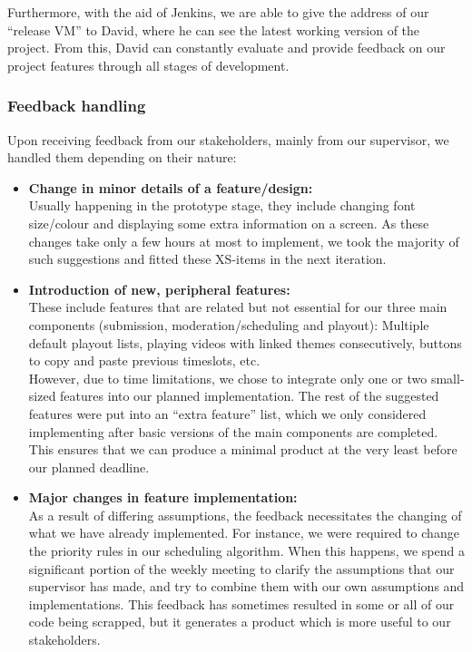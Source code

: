 \documentclass[a4paper, titlepage]{article}
\begin{document}
Furthermore, with the aid of Jenkins, we are able to give the address of our ``release VM'' to David, where he can see the latest working version of the project. From this, David can constantly evaluate and provide feedback on our project features through all stages of development.

\subsubsection{Feedback handling}

Upon receiving feedback from our stakeholders, mainly from our supervisor, we handled them depending on their nature:

\begin{itemize}

  \item \textbf{Change in minor details of a feature/design:} \\
        Usually happening in the prototype stage, they include changing font size/colour and displaying some extra information on a screen. As these changes take only a few hours at most to implement, we took the majority of such suggestions and fitted these XS-items in the next iteration.

  \item \textbf{Introduction of new, peripheral features:} \\
        These include features that are related but not essential for our three main components (submission, moderation/scheduling and playout): Multiple default playout lists, playing videos with linked themes consecutively, buttons to copy and paste previous timeslots, etc. \\
        However, due to time limitations, we chose to integrate only one or two small-sized features into our planned implementation. The rest of the suggested features were put into an ``extra feature'' list, which we only considered implementing after basic versions of the main components are completed. This ensures that we can produce a minimal product at the very least before our planned deadline.

  \item \textbf{Major changes in feature implementation:} \\
        As a result of differing assumptions, the feedback necessitates the changing of what we have already implemented. For instance, we were required to change the priority rules in our scheduling algorithm. When this happens, we spend a significant portion of the weekly meeting to clarify the assumptions that our supervisor has made, and try to combine them with our own assumptions and implementations. This feedback has sometimes resulted in some or all of our code being scrapped, but it generates a product which is more useful to our stakeholders.

\end{itemize}
\end{document}
